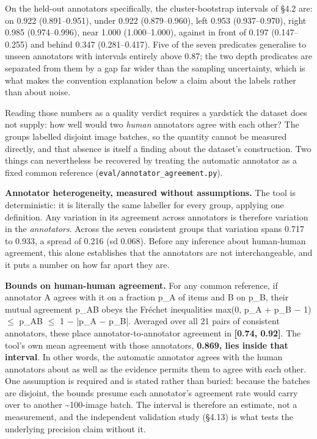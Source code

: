 On the held-out annotators specifically, the cluster-bootstrap intervals of \S4.2 are: on 0.922 (0.891--0.951), under 0.922 (0.879--0.960), left 0.953 (0.937--0.970), right 0.985 (0.974--0.996), near 1.000 (1.000--1.000), against in front of 0.197 (0.147--0.255) and behind 0.347 (0.281--0.417). Five of the seven predicates generalise to unseen annotators with intervals entirely above 0.87; the two depth predicates are separated from them by a gap far wider than the sampling uncertainty, which is what makes the convention explanation below a claim about the labels rather than about noise.

Reading those numbers as a quality verdict requires a yardstick the dataset does not supply: how well would two \textit{human} annotators agree with each other? The groups labelled disjoint image batches, so the quantity cannot be measured directly, and that absence is itself a finding about the dataset's construction. Two things can nevertheless be recovered by treating the automatic annotator as a fixed common reference (\texttt{eval/annotator\_agreement.py}).

\textbf{Annotator heterogeneity, measured without assumptions.} The tool is deterministic: it is literally the same labeller for every group, applying one definition. Any variation in its agreement across annotators is therefore variation in the \textit{annotators}. Across the seven consistent groups that variation spans 0.717 to 0.933, a spread of 0.216 (sd 0.068). Before any inference about human-human agreement, this alone establishes that the annotators are not interchangeable, and it puts a number on how far apart they are.

\textbf{Bounds on human-human agreement.} For any common reference, if annotator A agrees with it on a fraction p\_A of items and B on p\_B, their mutual agreement p\_AB obeys the Fréchet inequalities max(0, p\_A + p\_B − 1) $\leq$ p\_AB $\leq$ 1 − |p\_A − p\_B|. Averaged over all 21 pairs of consistent annotators, these place annotator-to-annotator agreement in \textbf{[0.74, 0.92]}. The tool's own mean agreement with those annotators, \textbf{0.869, lies inside that interval}. In other words, the automatic annotator agrees with the human annotators about as well as the evidence permits them to agree with each other. One assumption is required and is stated rather than buried: because the batches are disjoint, the bounds presume each annotator's agreement rate would carry over to another \textasciitilde{}100-image batch. The interval is therefore an estimate, not a measurement, and the independent validation study (\S4.13) is what tests the underlying precision claim without it.

